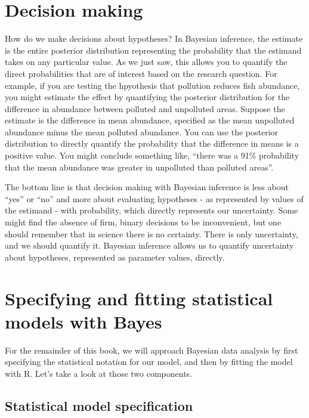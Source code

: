 \documentclass[
]{book}
\begin{document}
\section{Decision making}\label{decision-making}

How do we make decisions about hypotheses? In Bayesian inference, the
estimate is the entire posterior distribution representing the
probability that the estimand takes on any particular value. As we just
saw, this allows you to quantify the direct probabilities that are of
interest based on the research question. For example, if you are testing
the hpyothesis that pollution reduces fish abundance, you might estimate
the effect by quantifying the posterior distribution for the difference
in abundance between polluted and unpolluted areas. Suppose the estimate
is the difference in mean abundance, specified as the mean unpolluted
abundance minus the mean polluted abundance. You can use the posterior
distribution to directly quantify the probability that the difference in
means is a positive value. You might conclude something like, ``there was
a 91\% probability that the mean abundance was greater in unpolluted than
polluted areas''.

The bottom line is that decision making with Bayesian inference is less
about ``yes'' or ``no'' and more about evaluating hypotheses - as
represented by values of the estimand - with probability, which directly
represents our uncertainty. Some might find the absence of firm, binary
decisions to be inconvenient, but one should remember that in science
there is no certainty. There is only uncertainty, and we should quantify
it. Bayesian inference allows us to quantify uncertainty about
hypotheses, represented as parameter values, directly.

\section{Specifying and fitting statistical models with Bayes}\label{specifying-and-fitting-statistical-models-with-bayes}

For the remainder of this book, we will approach Bayesian data analysis
by first specifying the statistical notation for our model, and then by
fitting the model with R. Let's take a look at those two components.

\subsection{Statistical model specification}\label{statistical-model-specification}
\end{document}
